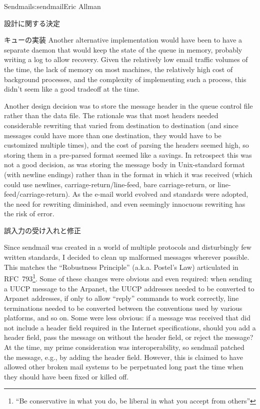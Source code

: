 \begin{aosachapter}{Sendmail}{s:sendmail}{Eric Allman}
\begin{aosasect1}{設計に関する決定}
\begin{aosasect2}{キューの実装}
Another alternative implementation would have been to have a separate
daemon that would keep the state of the queue in memory, probably
writing a log to allow recovery. Given the relatively low email
traffic volumes of the time, the lack of memory on most machines,
the relatively high cost of background processes,
and the complexity of implementing such a process,
this didn't seem
like a good tradeoff at the time.

Another design decision was to store the message header in the queue
control file rather than the data file. The rationale was that most
headers needed considerable rewriting that varied from destination to
destination (and since messages could have more than one destination,
they would have to be customized multiple times), and the cost of
parsing the headers seemed high, so storing them in a pre-parsed
format seemed like a savings. In retrospect this was not a good decision,
as was storing the message body in Unix-standard format (with newline
endings) rather than in the format in which it was received (which
could use newlines, carriage-return/line-feed, bare carriage-return,
or line-feed/carriage-return). As the e-mail world evolved and
standards were adopted, the need for rewriting diminished, and even
seemingly innocuous rewriting has the risk of error.

\end{aosasect2}

\begin{aosasect2}{誤入力の受け入れと修正}

Since sendmail was created in a world of multiple protocols and
disturbingly few written standards, I decided to clean up malformed
messages wherever possible.
This matches the ``Robustness Principle'' (a.k.a. Postel's Law)
articulated in RFC~793\footnote{``Be conservative in what you do,
be liberal in what you accept from others''}.
Some of these changes were obvious and even required:
when sending a
UUCP message to the Arpanet, the UUCP addresses needed to be converted
to Arpanet addresses, if only to allow ``reply'' commands to work
correctly,
line terminations needed to be converted between the conventions used
by various platforms, and so on.
Some were less obvious: if a message was received that did
not include a  header field required in the Internet
specifications, should you add a  header field, pass the
message on without the  header field, or reject the message?  At
the time, my prime consideration was interoperability, so sendmail
patched the message, e.g., by adding the  header
field. However, this is claimed to have allowed other broken mail
systems to be perpetuated long past the time when they should have
been fixed or killed off.


\end{aosasect2}
\end{aosasect1}
\end{aosachapter}
